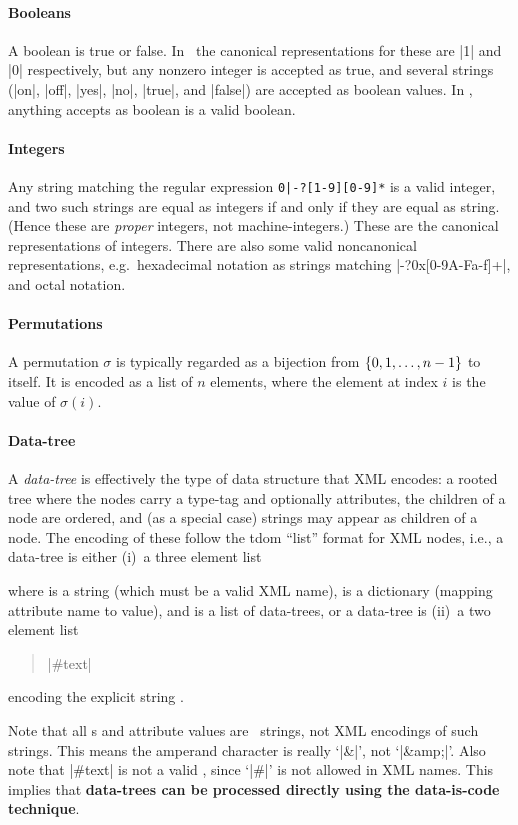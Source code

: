 \documentclass{mtmtcl}
\theoremstyle{plain}
\theoremstyle{remark}
\begin{document}
\paragraph{Booleans}
A boolean is true or false. In \Tcl\ the canonical representations 
for these are |1| and |0| respectively, but any nonzero integer is 
accepted as true, and several strings (|on|, |off|, |yes|, |no|, 
|true|, and |false|) are accepted as boolean values. In \mtl, 
anything  accepts as boolean 
is a valid boolean.

\paragraph{Integers}
Any string matching the regular expression \verb"0|-?[1-9][0-9]*" is 
a valid integer, and two such strings are equal as integers if and 
only if they are equal as string. (Hence these are \emph{proper} 
integers, not machine-integers.) These are the canonical 
representations of integers. There are also some valid noncanonical 
representations, e.g.~hexadecimal notation as strings matching 
|-?0x[0-9A-Fa-f]+|, and octal notation.

\paragraph{Permutations}
A permutation $\sigma$ is typically regarded as a bijection from 
$\{0,1,\dotsc, n-\nobreak1\}$ to itself. It is encoded as a list of 
$n$ elements, where the element at index $i$ is the value of 
$\sigma(i)$.

\paragraph{Data-tree}
A \emph{data-tree} is effectively the type of data structure that 
XML encodes: a rooted tree where the nodes carry a type-tag and 
optionally attributes, the children of a node are ordered, and (as a 
special case) strings may appear as children of a node. The encoding 
of these follow the \textsf{tdom} ``list'' format for XML nodes, 
i.e., a data-tree is either (i)~a three element list
\begin{quote}
    
\end{quote}
where  is a string (which must be a valid XML name), 
 is a dictionary (mapping attribute name to value), 
and  is a list of data-trees, or a data-tree is (ii)~a 
two element list
\begin{quote}
  |#text| 
\end{quote}
encoding the explicit string .

Note that all s and attribute values are \Tcl\ strings, 
not XML encodings of such strings. This means the amperand character 
is really `|&|', not `|&amp;|'. Also note that |#text| is not a valid 
, since `|#|' is not allowed in XML names. This implies 
that \textbf{data-trees can be processed directly using the 
data-is-code technique}.



\PrintIndex
\end{document}
